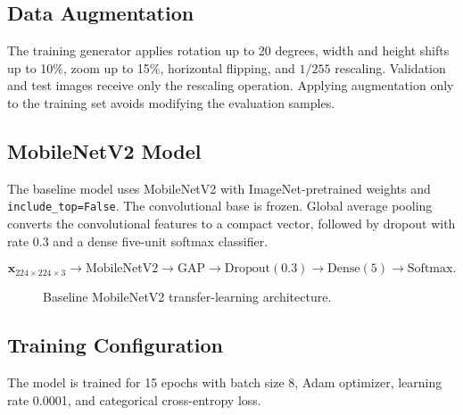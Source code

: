 \documentclass[conference]{IEEEtran}
\begin{document}
\subsection{Data Augmentation}
The training generator applies rotation up to 20 degrees, width and height shifts up to 10\%, zoom up to 15\%, horizontal flipping, and $1/255$ rescaling. Validation and test images receive only the rescaling operation. Applying augmentation only to the training set avoids modifying the evaluation samples.

\subsection{MobileNetV2 Model}
The baseline model uses MobileNetV2 with ImageNet-pretrained weights and \texttt{include\_top=False}. The convolutional base is frozen. Global average pooling converts the convolutional features to a compact vector, followed by dropout with rate 0.3 and a dense five-unit softmax classifier.

\begin{equation}
\mathbf{x}_{224\times224\times3}\rightarrow\mathrm{MobileNetV2}\rightarrow\mathrm{GAP}\rightarrow\mathrm{Dropout}(0.3)\rightarrow\mathrm{Dense}(5)\rightarrow\mathrm{Softmax}.
\end{equation}

\begin{figure}[!t]
\centering
{}
\caption{Baseline MobileNetV2 transfer-learning architecture.}
\label{fig:architecture}
\end{figure}

\subsection{Training Configuration}
The model is trained for 15 epochs with batch size 8, Adam optimizer, learning rate 0.0001, and categorical cross-entropy loss.
\end{document}
